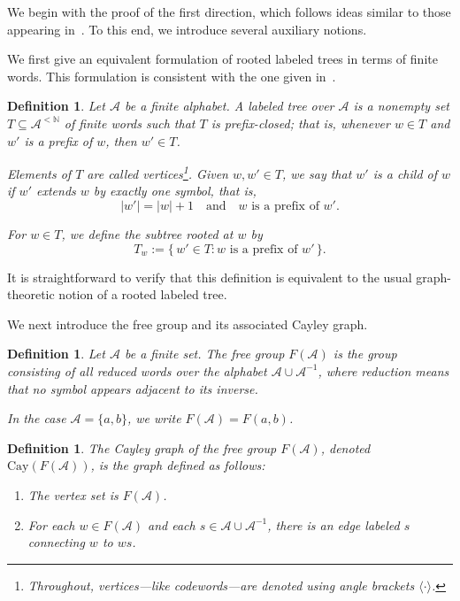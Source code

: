 \documentclass[a4,12pt]{article}%
\newtheorem{definition}[theorem]{Definition}
\begin{document}
We begin with the proof of the first direction, which follows ideas similar to those appearing in~\cite{PrefixCodesandFreeGroups}. To this end, we introduce several auxiliary notions.

\medskip

We first give an equivalent formulation of rooted labeled trees in terms of finite words. This formulation is consistent with the one given in~\cite{SolanBook}.

\begin{definition}
Let $\mathcal{A}$ be a finite alphabet. A \emph{labeled tree} over $\mathcal{A}$ is a nonempty set $T \subseteq \mathcal{A}^{<\mathbb{N}}$ of finite words such that $T$ is prefix-closed; that is, whenever $w \in T$ and $w'$ is a prefix of $w$, then $w' \in T$.

Elements of $T$ are called \emph{vertices}\footnote{Throughout, vertices—like codewords—are denoted using angle brackets $\langle \cdot \rangle$.}. Given $w, w' \in T$, we say that $w'$ is a \emph{child} of $w$ if $w'$ extends $w$ by exactly one symbol, that is,
\[
\lvert w' \rvert = \lvert w \rvert + 1 \quad \text{and} \quad w \text{ is a prefix of } w'.
\]

For $w \in T$, we define the \emph{subtree rooted at $w$} by
\[
T_w := \{\, w' \in T : w \text{ is a prefix of } w' \,\}.
\]
\end{definition}

\medskip

It is straightforward to verify that this definition is equivalent to the usual graph-theoretic notion of a rooted labeled tree.

\medskip

We next introduce the free group and its associated Cayley graph.

\begin{definition}
Let $\mathcal{A}$ be a finite set. The \emph{free group} $F(\mathcal{A})$ is the group consisting of all reduced words over the alphabet $\mathcal{A} \cup \mathcal{A}^{-1}$, where reduction means that no symbol appears adjacent to its inverse.

In the case $\mathcal{A} = \{a,b\}$, we write $F(\mathcal{A}) = F(a,b)$.
\end{definition}

\begin{definition}
The \emph{Cayley graph} of the free group $F(\mathcal{A})$, denoted $\mathrm{Cay}(F(\mathcal{A}))$, is the graph defined as follows:
\begin{enumerate}
    \item The vertex set is $F(\mathcal{A})$.
    \item For each $w \in F(\mathcal{A})$ and each $s \in \mathcal{A} \cup \mathcal{A}^{-1}$, there is an edge labeled $s$ connecting $w$ to $ws$.
\end{enumerate}
\end{definition}
\end{document}
